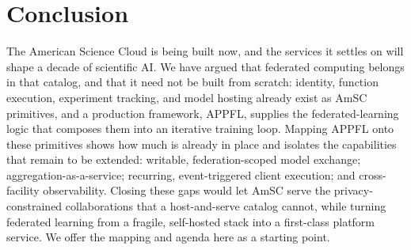 \documentclass[conference]{IEEEtran}
\begin{document}






\section{Conclusion}
The American Science Cloud is being built now, and the services it settles on will shape a decade of scientific AI. We have argued that federated computing belongs in that catalog, and that it need not be built from scratch: identity, function execution, experiment tracking, and model hosting already exist as AmSC primitives, and a production framework, APPFL, supplies the federated-learning logic that composes them into an iterative training loop. Mapping APPFL onto these primitives shows how much is already in place and isolates the capabilities that remain to be extended: writable, federation-scoped model exchange; aggregation-as-a-service; recurring, event-triggered client execution; and cross-facility observability. Closing these gaps would let AmSC serve the privacy-constrained collaborations that a host-and-serve catalog cannot, while turning federated learning from a fragile, self-hosted stack into a first-class platform service. We offer the mapping and agenda here as a starting point.
\end{document}
